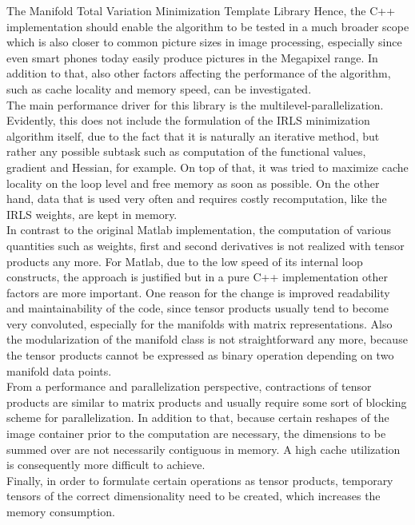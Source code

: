 \begin{chapter}{The Manifold Total Variation Minimization Template Library}
Hence, the C++ implementation should enable the algorithm to be tested in a much broader scope which is
also closer to common picture sizes in image processing, especially since even smart phones today easily produce pictures in the Megapixel range.
In addition to that, also other factors affecting the performance of the algorithm, such as cache locality and memory speed, can be investigated.\\

The main performance driver for this library is the multilevel-parallelization. Evidently, this does not include the formulation of the IRLS minimization algorithm itself, due to the fact that
it is naturally an iterative method, but rather any possible subtask such as computation of the functional values, gradient and Hessian, for example. On top of that, it was tried to
maximize cache locality on the loop level and free memory as soon as possible.
On the other hand, data that is used very often and requires costly recomputation, like the IRLS weights, are kept in memory.\\ 

In contrast to the original Matlab implementation, the computation of various quantities such as weights, first and second derivatives is not realized with tensor products any more.
For Matlab, due to the low speed of its internal loop constructs, the approach is justified but in a pure C++ implementation other factors are more important.
One reason for the change is improved readability and maintainability of the code, since tensor products usually tend to become very convoluted,
especially for the manifolds with matrix representations. Also the modularization of the manifold class is not straightforward any more, because the tensor products cannot be expressed as binary operation depending on two manifold data points.\\

From a performance and parallelization perspective, contractions of tensor products are similar to matrix products and usually require some sort of blocking scheme for parallelization.
In addition to that, because certain reshapes of the image container prior to the computation are necessary, the dimensions to be summed over are not necessarily contiguous in memory.
A high cache utilization is consequently more difficult to achieve.\\
Finally, in order to formulate certain operations as tensor products, temporary tensors of the correct dimensionality need to be created, which increases the memory consumption.\\


\end{chapter}
